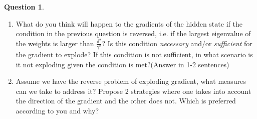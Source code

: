 \documentclass[12pt]{article}
\newif\ifsolution
\theoremstyle{definition}
\newtheorem{exercise}{Question}%
\newtheorem{answer}{Answer} %
\newcommand{\Answer}[1]{
\ifsolution\color{answer}\begin{answer}#1\end{answer}\fi
}
\newif\ifsolution
\begin{document}
\begin{exercise}
\begin{enumerate}[label=\arabic{exercise}.\arabic*]
        \item What do you think will happen to the gradients of the hidden state if the condition in the previous question is reversed, i.e. if the largest eigenvalue of the weights is larger than $\frac{\delta^2}{\gamma^2}$? 
        Is this condition \textit{necessary} and/or \textit{sufficient} for the gradient to explode? If this condition is not sufficient, in what scenario is it not exploding given the condition is met?(Answer in 1-2 sentences)
        \item Assume we have the reverse problem of exploding gradient, what measures can we take to address it? Propose 2 strategies where one takes into account the direction of the gradient and the other does not. Which is preferred according to you and why?
    \end{enumerate}
    \vspace{0.4cm}
    \Answer{
    }
\end{exercise}
\end{document}
